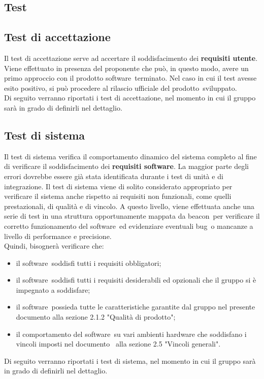 \documentclass[../PianoDiQualifica.tex]{subfiles}
\begin{document}
\begin{appendices}

\section{Test}
	\subsection{Test di accettazione}
	Il test di accettazione serve ad accertare il soddisfacimento dei \textbf{requisiti utente}. Viene effettuato in presenza del proponente che può, in questo modo, avere un primo approccio con il prodotto software\g\ terminato. Nel caso in cui il test avesse esito positivo, si può procedere al rilascio ufficiale del prodotto\g\ 
sviluppato.\\
	Di seguito verranno riportati i test di accettazione, nel momento in cui il gruppo sarà in grado di definirli nel dettaglio.
	\subsection{Test di sistema}
	Il test di sistema verifica il comportamento dinamico del sistema completo al fine di verificare il soddisfacimento dei \textbf{requisiti software}. La maggior parte degli errori dovrebbe essere già stata identificata durante i test di unità e di integrazione. Il test di sistema viene di solito considerato appropriato per verificare il sistema anche rispetto ai requisiti non funzionali, come quelli prestazionali, di qualità e di vincolo. A questo livello, viene effettuata anche una serie di test in una struttura opportunamente mappata da beacon\g\ per verificare il corretto funzionamento del software\g\ ed evidenziare eventuali bug\g\ o mancanze a livello di performance e precisione.\\
	Quindi, bisognerà verificare che:
	\begin{itemize}
		\item il software\g\ soddisfi tutti i requisiti obbligatori;
		\item il software\g\ soddisfi tutti i requisiti desiderabili ed opzionali che il gruppo si è impegnato a soddisfare;
		\item il software\g\ possieda tutte le caratteristiche garantite dal gruppo nel presente documento alla sezione 2.1.2 "Qualità di prodotto";
		\item il comportamento del software\g\ su vari ambienti hardware che soddisfano i vincoli imposti nel documento \analisideirequisiti\ alla sezione 2.5 "Vincoli generali".
	\end{itemize}
	Di seguito verranno riportati i test di sistema, nel momento in cui il gruppo sarà in grado di definirli nel dettaglio.
\end{appendices}
\end{document}
